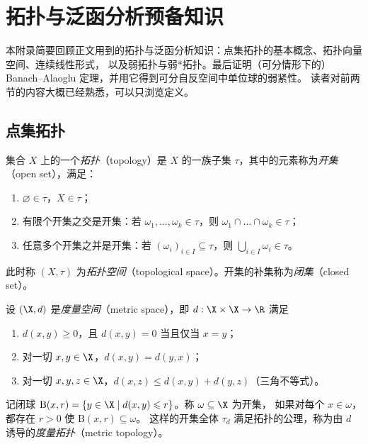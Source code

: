 \chapter{拓扑与泛函分析预备知识}
\label{ch:appA}

\providecommand{\Xss}{\mathcal{X}^{**}}

本附录简要回顾正文用到的拓扑与泛函分析知识：点集拓扑的基本概念、拓扑向量空间、连续线性形式，
以及弱拓扑与弱*拓扑。最后证明（可分情形下的）Banach--Alaoglu 定理，并用它得到可分自反空间中单位球的弱紧性。
读者对前两节的内容大概已经熟悉，可以只浏览定义。

\section{点集拓扑}

\begin{definition}[拓扑]
\label{def:28}
集合 $X$ 上的一个\emph{拓扑}（topology）是 $X$ 的一族子集 $\tau$，其中的元素称为\emph{开集}（open set），满足：
\begin{enumerate}[label=(\roman*)]
  \item $\varnothing\in\tau$，$X\in\tau$；
  \item 有限个开集之交是开集：若 $\omega_1,\dots,\omega_k\in\tau$，则 $\omega_1\cap\dots\cap\omega_k\in\tau$；
  \item 任意多个开集之并是开集：若 $(\omega_i)_{i\in I}\subseteq\tau$，则 $\bigcup_{i\in I}\omega_i\in\tau$。
\end{enumerate}
此时称 $(X,\tau)$ 为\emph{拓扑空间}（topological space）。开集的补集称为\emph{闭集}（closed set）。
\end{definition}

\begin{example}[度量拓扑]
\label{exa:26}
设 $(\X,d)$ 是\emph{度量空间}（metric space），即 $d:\X\times\X\to\R$ 满足
\begin{enumerate}[label=(\roman*)]
  \item $d(x,y)\geqslant 0$，且 $d(x,y)=0$ 当且仅当 $x=y$；
  \item 对一切 $x,y\in\X$，$d(x,y)=d(y,x)$；
  \item 对一切 $x,y,z\in\X$，$d(x,z)\leqslant d(x,y)+d(y,z)$（三角不等式）。
\end{enumerate}
记闭球 $\mathrm{B}(x,r)=\{y\in\X\mid d(x,y)\leqslant r\}$。称 $\omega\subseteq\X$ 为开集，
如果对每个 $x\in\omega$，都存在 $r>0$ 使 $\mathrm{B}(x,r)\subseteq\omega$。
这样的开集全体 $\tau_d$ 满足拓扑的公理，称为由 $d$ 诱导的\emph{度量拓扑}（metric topology）。
\end{example}

